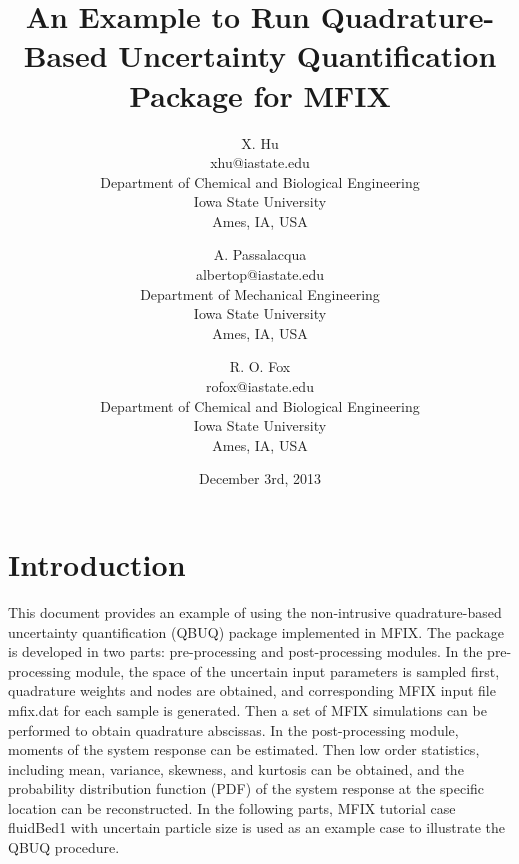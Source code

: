 \documentclass[a4paper,12pt,titlepage]{article}
\begin{document}
\begin{titlepage}
\title{An Example to Run Quadrature-Based Uncertainty Quantification Package 
 for MFIX}

\author{X. Hu \\ 
        xhu@iastate.edu \\
        Department of Chemical and Biological Engineering \\
        Iowa State University \\
        Ames, IA, USA \\
        \and
        A. Passalacqua \\
        albertop@iastate.edu \\
        Department of Mechanical  Engineering \\
        Iowa State University \\
        Ames, IA, USA \\
        \and
        R. O. Fox \\
        rofox@iastate.edu \\
        Department of Chemical and Biological Engineering \\
        Iowa State University \\
        Ames, IA, USA}
\date{December 3rd, 2013}
\maketitle
\end{titlepage}

\section{Introduction}
\label{sec:Introduction}
This document provides an example of using the non-intrusive quadrature-based 
uncertainty quantification (QBUQ) package implemented in MFIX. The package is 
developed in two parts: pre-processing and post-processing modules. In the
pre-processing module, the space of the uncertain input parameters is sampled
first, quadrature weights and nodes are obtained, and corresponding MFIX input
file mfix.dat for each sample is generated. Then a set of MFIX simulations
can be performed to obtain quadrature abscissas. In the post-processing module,
moments of the system response can be estimated. Then low order statistics, 
including mean, variance, skewness, and kurtosis can be obtained, and the
probability distribution function (PDF) of the system response at the specific
location can be reconstructed. In the following parts, MFIX tutorial case 
fluidBed1 with uncertain particle size is used as an example case to illustrate 
the QBUQ procedure. 
\end{document}
